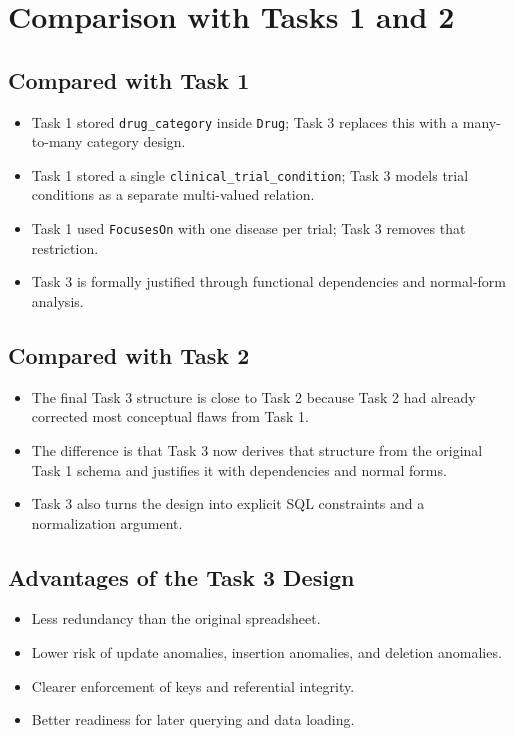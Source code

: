 \documentclass[12pt,a4paper]{article}
\begin{document}
\section{Comparison with Tasks 1 and 2}
\subsection{Compared with Task 1}
\begin{itemize}[leftmargin=1.5em]
    \item Task 1 stored \texttt{drug\_category} inside \texttt{Drug}; Task 3 replaces this with a many-to-many category design.
    \item Task 1 stored a single \texttt{clinical\_trial\_condition}; Task 3 models trial conditions as a separate multi-valued relation.
    \item Task 1 used \texttt{FocusesOn} with one disease per trial; Task 3 removes that restriction.
    \item Task 3 is formally justified through functional dependencies and normal-form analysis.
\end{itemize}

\subsection{Compared with Task 2}
\begin{itemize}[leftmargin=1.5em]
    \item The final Task 3 structure is close to Task 2 because Task 2 had already corrected most conceptual flaws from Task 1.
    \item The difference is that Task 3 now derives that structure from the original Task 1 schema and justifies it with dependencies and normal forms.
    \item Task 3 also turns the design into explicit SQL constraints and a normalization argument.
\end{itemize}

\subsection{Advantages of the Task 3 Design}
\begin{itemize}[leftmargin=1.5em]
    \item Less redundancy than the original spreadsheet.
    \item Lower risk of update anomalies, insertion anomalies, and deletion anomalies.
    \item Clearer enforcement of keys and referential integrity.
    \item Better readiness for later querying and data loading.
\end{itemize}
\end{document}
